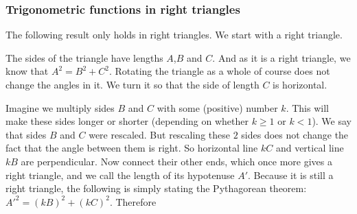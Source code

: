 \subsubsection{Trigonometric functions in right triangles}

\noindent The following result only holds in right triangles. We start with a right triangle.
\begin{center}
\end{center}
\noindent The sides of the triangle have lengths $A$,$B$ and $C$. And as it is a right triangle, we know that $A^2 = B^2 + C^2$. Rotating the triangle as a whole of course does not change the angles in it. We turn it so that the side of length $C$ is horizontal.
\begin{center}
\end{center}
\noindent Imagine we multiply sides $B$ and $C$ with some (positive) number $k$. This will make these sides longer or shorter (depending on whether $k \geq 1$ or $k < 1$). We say that sides $B$ and $C$ were rescaled. But rescaling these $2$ sides does not change the fact that the angle between them is right. So horizontal line $kC$ and vertical line $kB$ are perpendicular. Now connect their other ends, which once more gives a right triangle, and we call the length of its hypotenuse $A'$. Because it is still a right triangle, the following is simply stating the Pythagorean theorem: $A'^2 = \left(kB\right)^2 + \left( k C \right)^2 $. Therefore 
